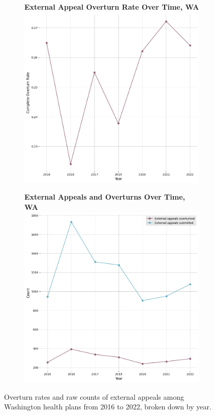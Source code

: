 \documentclass[12pt, a4paper,twoside]{report}
\theoremstyle{plain} %
\theoremstyle{definition} %
\theoremstyle{remark} %
\numberwithin{equation}{chapter}
\begin{document}
		
		\begin{figure}[h!]
			\centering
			\begin{subfigure}[b]{0.49\textwidth}
				\centering
				\textbf{External Appeal Overturn Rate Over Time, WA}
				\includegraphics[width=\textwidth]{images/wa_external_appeals/external_appeal_overturn_rates_by_year.png}
			\end{subfigure}
			\hfill
			\begin{subfigure}[b]{0.49\textwidth}
				\centering
				\textbf{External Appeals and Overturns Over Time, WA}
				\includegraphics[width=\textwidth]{images/wa_external_appeals/external_appeals_by_year.png}
			\end{subfigure}
			\caption{Overturn rates and raw counts of external appeals among Washington health plans from 2016 to 2022, broken down by year.}
			\label{waexternalappealsovertime}
		\end{figure}
	
\end{document}
